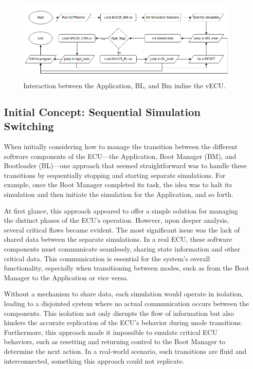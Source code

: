 \begin{figure}[htpb]
  \centering
  \includegraphics[width=1\textwidth]{figures/complete_setup.PNG}
  \caption{Interaction between the Application, BL, and Bm indise the vECU.} \label{fig:vECU_setup}
\end{figure}

\subsection{Initial Concept: Sequential Simulation Switching}
When initially considering how to manage the transition between the different software components of the ECU—the Application, Boot Manager (BM), and Bootloader (BL)—one approach that seemed straightforward was to handle these transitions by sequentially stopping and starting separate simulations. For example, once the Boot Manager completed its task, the idea was to halt its simulation and then initiate the simulation for the Application, and so forth.

At first glance, this approach appeared to offer a simple solution for managing the distinct phases of the ECU’s operation. However, upon deeper analysis, several critical flaws became evident. The most significant issue was the lack of shared data between the separate simulations. In a real ECU, these software components must communicate seamlessly, sharing state information and other critical data. This communication is essential for the system’s overall functionality, especially when transitioning between modes, such as from the Boot Manager to the Application or vice versa.

Without a mechanism to share data, each simulation would operate in isolation, leading to a disjointed system where no actual communication occurs between the components. This isolation not only disrupts the flow of information but also hinders the accurate replication of the ECU’s behavior during mode transitions. Furthermore, this approach made it impossible to emulate critical ECU behaviors, such as resetting and returning control to the Boot Manager to determine the next action. In a real-world scenario, such transitions are fluid and interconnected, something this approach could not replicate.


